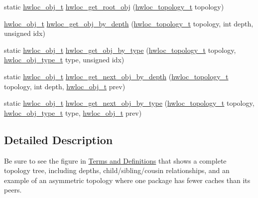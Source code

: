 \begin{DoxyCompactItemize}
\item 
static \hyperlink{a00185_ga79b8ab56877ef99ac59b833203391c7d}{hwloc\+\_\+obj\+\_\+t} \hyperlink{a00187_ga2d4b12fc187dfc53b35f2fa21d21044d}{hwloc\+\_\+get\+\_\+root\+\_\+obj} (\hyperlink{a00186_ga9d1e76ee15a7dee158b786c30b6a6e38}{hwloc\+\_\+topology\+\_\+t} topology)
\item 
\hyperlink{a00185_ga79b8ab56877ef99ac59b833203391c7d}{hwloc\+\_\+obj\+\_\+t} \hyperlink{a00187_ga391f6b2613f0065673eaa4069b93d4e0}{hwloc\+\_\+get\+\_\+obj\+\_\+by\+\_\+depth} (\hyperlink{a00186_ga9d1e76ee15a7dee158b786c30b6a6e38}{hwloc\+\_\+topology\+\_\+t} topology, int depth, unsigned idx)
\item 
static \hyperlink{a00185_ga79b8ab56877ef99ac59b833203391c7d}{hwloc\+\_\+obj\+\_\+t} \hyperlink{a00187_ga6f414dd80a2b943967a0ac92da3181a2}{hwloc\+\_\+get\+\_\+obj\+\_\+by\+\_\+type} (\hyperlink{a00186_ga9d1e76ee15a7dee158b786c30b6a6e38}{hwloc\+\_\+topology\+\_\+t} topology, \hyperlink{a00184_gacd37bb612667dc437d66bfb175a8dc55}{hwloc\+\_\+obj\+\_\+type\+\_\+t} type, unsigned idx)
\item 
static \hyperlink{a00185_ga79b8ab56877ef99ac59b833203391c7d}{hwloc\+\_\+obj\+\_\+t} \hyperlink{a00187_gac140a9b939d9fa0b30c4a910efcb0656}{hwloc\+\_\+get\+\_\+next\+\_\+obj\+\_\+by\+\_\+depth} (\hyperlink{a00186_ga9d1e76ee15a7dee158b786c30b6a6e38}{hwloc\+\_\+topology\+\_\+t} topology, int depth, \hyperlink{a00185_ga79b8ab56877ef99ac59b833203391c7d}{hwloc\+\_\+obj\+\_\+t} prev)
\item 
static \hyperlink{a00185_ga79b8ab56877ef99ac59b833203391c7d}{hwloc\+\_\+obj\+\_\+t} \hyperlink{a00187_ga759e88eaf5a230ad283e9d4c42486735}{hwloc\+\_\+get\+\_\+next\+\_\+obj\+\_\+by\+\_\+type} (\hyperlink{a00186_ga9d1e76ee15a7dee158b786c30b6a6e38}{hwloc\+\_\+topology\+\_\+t} topology, \hyperlink{a00184_gacd37bb612667dc437d66bfb175a8dc55}{hwloc\+\_\+obj\+\_\+type\+\_\+t} type, \hyperlink{a00185_ga79b8ab56877ef99ac59b833203391c7d}{hwloc\+\_\+obj\+\_\+t} prev)
\end{DoxyCompactItemize}


\subsection{Detailed Description}
Be sure to see the figure in \hyperlink{a00380}{Terms and Definitions} that shows a complete topology tree, including depths, child/sibling/cousin relationships, and an example of an asymmetric topology where one package has fewer caches than its peers. 

